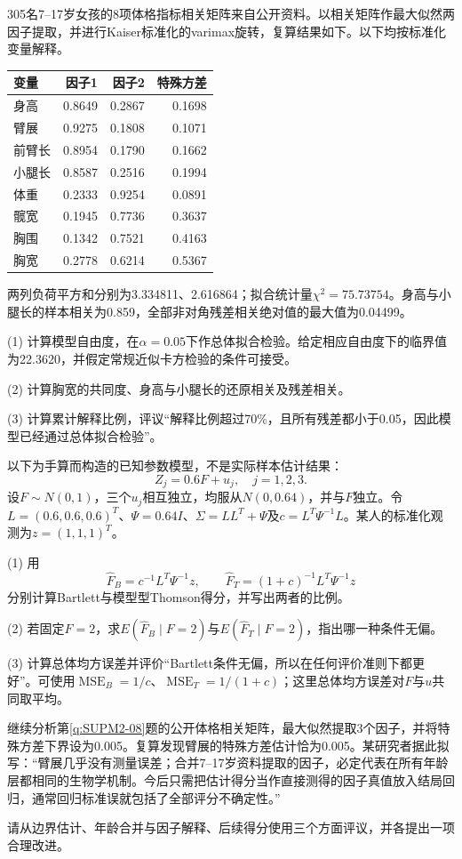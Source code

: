 305名7--17岁女孩的8项体格指标相关矩阵来自公开资料。以相关矩阵作最大似然两因子提取，并进行Kaiser标准化的varimax旋转，复算结果如下。以下均按标准化变量解释。\begin{center}\small\setlength{\tabcolsep}{5pt}\begin{tabular}{lrrr}\toprule 变量 & 因子1 & 因子2 & 特殊方差\\\midrule 身高 & 0.8649 & 0.2867 & 0.1698\\ 臂展 & 0.9275 & 0.1808 & 0.1071\\ 前臂长 & 0.8954 & 0.1790 & 0.1662\\ 小腿长 & 0.8587 & 0.2516 & 0.1994\\ 体重 & 0.2333 & 0.9254 & 0.0891\\ 髋宽 & 0.1945 & 0.7736 & 0.3637\\ 胸围 & 0.1342 & 0.7521 & 0.4163\\ 胸宽 & 0.2778 & 0.6214 & 0.5367\\\bottomrule\end{tabular}\end{center}两列负荷平方和分别为3.334811、2.616864；拟合统计量$\chi^2=75.73754$。身高与小腿长的样本相关为0.859，全部非对角残差相关绝对值的最大值为0.04499。\par (1) 计算模型自由度，在$\alpha=0.05$下作总体拟合检验。给定相应自由度下的临界值为22.3620，并假定常规近似卡方检验的条件可接受。\par (2) 计算胸宽的共同度、身高与小腿长的还原相关及残差相关。\par (3) 计算累计解释比例，评议“解释比例超过70\%，且所有残差都小于0.05，因此模型已经通过总体拟合检验”。

以下为手算而构造的已知参数模型，不是实际样本估计结果：\[Z_j=0.6F+u_j,\quad j=1,2,3.\]设$F\sim N(0,1)$，三个$u_j$相互独立，均服从$N(0,0.64)$，并与$F$独立。令$L=(0.6,0.6,0.6)^T$、$\Psi=0.64I$、$\Sigma=LL^T+\Psi$及$c=L^T\Psi^{-1}L$。某人的标准化观测为$z=(1,1,1)^T$。\par (1) 用\[\widehat F_B=c^{-1}L^T\Psi^{-1}z,\qquad \widehat F_T=(1+c)^{-1}L^T\Psi^{-1}z\]分别计算Bartlett与模型型Thomson得分，并写出两者的比例。\par (2) 若固定$F=2$，求$E(\widehat F_B\mid F=2)$与$E(\widehat F_T\mid F=2)$，指出哪一种条件无偏。\par (3) 计算总体均方误差并评价“Bartlett条件无偏，所以在任何评价准则下都更好”。可使用$\operatorname{MSE}_B=1/c$、$\operatorname{MSE}_T=1/(1+c)$；这里总体均方误差对$F$与$u$共同取平均。

继续分析第\ref{q:SUPM2-08}题的公开体格相关矩阵，最大似然提取3个因子，并将特殊方差下界设为0.005。复算发现臂展的特殊方差估计恰为0.005。某研究者据此拟写：“臂展几乎没有测量误差；合并7--17岁资料提取的因子，必定代表在所有年龄层都相同的生物学机制。今后只需把估计得分当作直接测得的因子真值放入结局回归，通常回归标准误就包括了全部评分不确定性。”\par 请从边界估计、年龄合并与因子解释、后续得分使用三个方面评议，并各提出一项合理改进。
